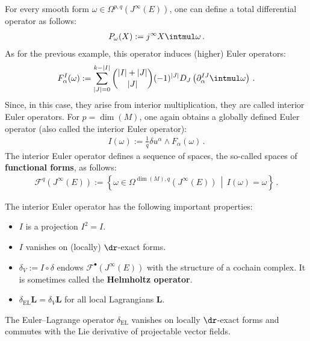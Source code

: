     \begin{example}
        For every smooth form $\omega\in\Omega^{p,q}(J^\infty(E))$, one can define a total differential operator as follows:
        \begin{gather}
            P_\omega(X) := j^\infty X\intmul\omega\,.
        \end{gather}
        As for the previous example, this operator induces (higher) Euler operators:
        \begin{gather}
            \label{var:interior_euler_operators}
            F^I_\alpha(\omega) := \sum_{|J|=0}^{k-|I|}\binom{|I|+|J|}{|J|}(-1)^{|J|}D_J\left(\partial^{IJ}_\alpha\intmul\omega\right)\,.
        \end{gather}
        Since, in this case, they arise from interior multiplication, they are called interior Euler operators. For $p=\dim(M)$, one again obtains a globally defined Euler operator (also called the interior Euler operator):
        \begin{gather}
            I(\omega) := \frac{1}{q}\delta u^\alpha\wedge F_\alpha(\omega)\,.
        \end{gather}
        The interior Euler operator defines a sequence of spaces, the so-called spaces of \textbf{functional forms}, as follows:
        \begin{gather}
            \label{var:functional_complex}
            \mathcal{F}^q(J^\infty(E)) := \left\{\omega\in\Omega^{\dim(M),q}(J^\infty(E))\,\middle\vert\,I(\omega)=\omega\right\}\,.
        \end{gather}
    \end{example}
    \begin{property}\label{var:I_properties}
        The interior Euler operator has the following important properties:
        \begin{itemize}
            \item $I$ is a projection $I^2=I$.
            \item $I$ vanishes on (locally) $\dr$-exact forms.
            \item $\delta_V := I\circ\delta$ endows $\mathcal{F}^\bullet(J^\infty(E))$ with the structure of a cochain complex. It is sometimes called the \textbf{Helmholtz operator}.
            \item $\delta_{\text{EL}}\mathbf{L} = \delta_V\mathbf{L}$ for all local Lagrangians $\mathbf{L}$.
        \end{itemize}
    \end{property}
    \begin{result}\label{var:EL_operator_properties}
        The Euler--Lagrange operator $\delta_{\text{EL}}$ vanishes on locally $\dr$-exact forms and commutes with the Lie derivative of projectable vector fields.
    \end{result}

